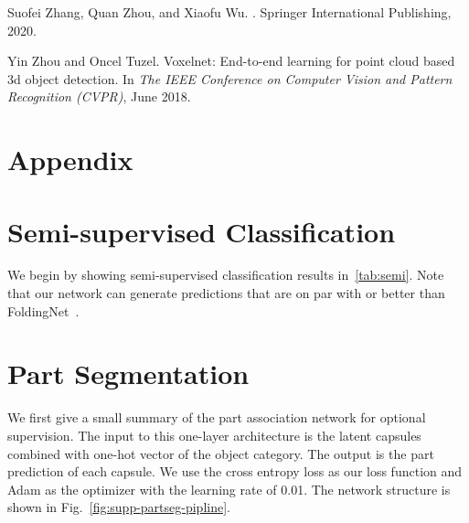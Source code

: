 \documentclass[10pt,twocolumn,letterpaper]{article}
\theoremstyle{break}
\begin{document}
{\begin{thebibliography}{10}
Suofei Zhang, Quan Zhou, and Xiaofu Wu.
.
\newblock Springer International Publishing, 2020.

Yin Zhou and Oncel Tuzel.
\newblock Voxelnet: End-to-end learning for point cloud based 3d object
  detection.
\newblock In {\em The IEEE Conference on Computer Vision and Pattern
  Recognition (CVPR)}, June 2018.

\end{thebibliography}
 }
\setcounter{section}{0}
\renewcommand\thesection{\Alph{section}}
\newcommand{\suppsection}{\subsection}
\section*{Appendix}\nonumber
\section{Semi-supervised Classification}
We begin by showing semi-supervised classification results in~\cref{tab:semi}. Note that our network can generate predictions that are on par with or better than FoldingNet~\cite{Yang_2018_CVPR}. \vspace{-5pt}
\begin{table}[htbp]
  \centering
  \caption{Part segmentation on ShapeNet-Part by learning on limited training data. The table shows the accuracies obtained by FoldingNet~\cite{Yang_2018_CVPR} and our approach for different amount of training data. }
\end{table} \vspace{-5pt}
\section{Part Segmentation}
We first give a small summary of the part association network for optional supervision. The input to this one-layer architecture is the latent capsules combined with one-hot vector of the object category. The output is the part prediction of each capsule. We use the cross entropy loss as our loss function and Adam as the optimizer with the learning rate of 0.01. The network structure is shown in Fig.~\ref{fig:supp-partseg-pipline}.
\end{document}
